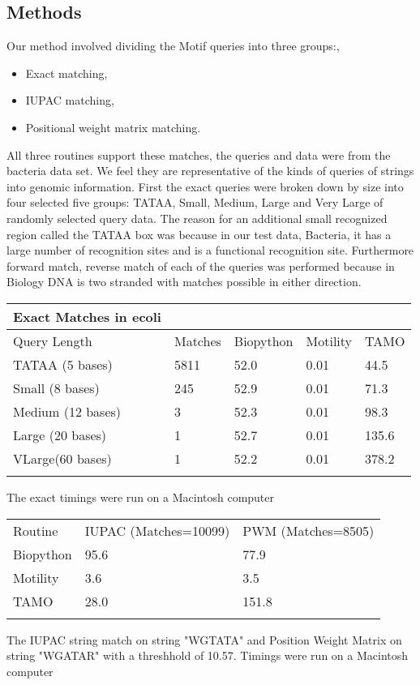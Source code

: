 \documentclass{bioinfo}
\begin{document}
\begin{methods}
\section{Methods}
Our method involved dividing the Motif queries into three groups:, 
\begin{itemize}
\item Exact matching,
\item IUPAC matching,
\item Positional weight matrix matching.  
\end{itemize}
All three routines support these matches,
the queries and data were from the bacteria data set. \citealp{BactXX} 
We feel they are representative of the kinds of queries of strings into
genomic information. First the exact queries were broken down by size into
four selected five groups:  TATAA, Small, Medium, Large and Very Large 
of randomly selected query data. The reason for an additional 
small recognized region called the TATAA box was because
in our test data, Bacteria, it 
has a large number of recognition sites and is a functional recognition site.  
Furthermore forward match, reverse match 
of each of  the queries was performed because in Biology 
DNA is two stranded with
matches possible in either direction.

\begin{table}[!t]
{\begin{tabular}{lllll}\toprule
Exact Matches in ecoli\\\midrule
Query Length 	 & Matches & Biopython & Motility & TAMO \\
TATAA (5 bases)  & 5811 &52.0 & 0.01 & 44.5\\
Small (8 bases)  & 245 &52.9 & 0.01 & 71.3\\
Medium (12 bases)& 3 &52.3 & 0.01 & 98.3\\
Large (20 bases) & 1 &52.7 & 0.01 & 135.6\\
VLarge(60 bases) & 1 &52.2 & 0.01 & 378.2\\\botrule
\end{tabular}}{The exact timings were run on a Macintosh computer}
\end{table}

\begin{table}[!t]
{\begin{tabular}{lll}\toprule
Routine 	& IUPAC (Matches=10099) & PWM (Matches=8505)\\
Biopython 	& 95.6 	& 77.9\\
Motility 	& 3.6 	& 3.5\\
TAMO 		& 28.0	& 151.8\\\botrule
\end{tabular}}{The IUPAC string match on string "WGTATA" and Position 
Weight Matrix on string "WGATAR" with a threshhold of 10.57.
Timings were run on a Macintosh computer}
\end{table}

\end{methods}
\end{document}
